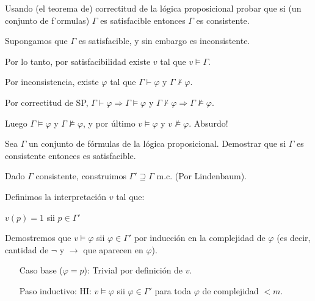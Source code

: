 \begin{questions}
\begin{solution}
\begin{itemize}[\quad]
 \end{itemize}

\end{solution}

\question Usando (el teorema de) correctitud de la lógica proposicional probar que si (un conjunto de f'ormulas) $\Gamma$ es satisfacible entonces $\Gamma$ es consistente. 


\begin{solution}

Supongamos que $\Gamma$ es satisfacible, y sin embargo es inconsistente. 

Por lo tanto, por satisfacibilidad existe $v$ tal que $v\vDash\Gamma$.

Por inconsistencia, existe $\varphi$ tal que $\Gamma \vdash \varphi$ y $\Gamma \nvdash \varphi$.

Por correctitud de SP, $\Gamma\vdash\varphi \Rightarrow \Gamma\vDash\varphi$ y $\Gamma\nvdash\varphi\Rightarrow \Gamma\nvDash\varphi$. 

Luego $\Gamma\vDash\varphi$ y $\Gamma\nvDash\varphi$, y por \'ultimo $v \vDash \varphi$ y $v \nvDash \varphi$. Absurdo!

\end{solution}

\question Sea $\Gamma$ un conjunto de f\'ormulas de la l\'ogica proposicional. Demostrar que si $\Gamma$ es consistente entonces es satisfacible. 


\begin{solution}
 
 Dado $\Gamma$ consistente, construimos $\Gamma'\supseteq\Gamma$ m.c. (Por Lindenbaum).
 
 Definimos la interpretaci\'on $v$ tal que: 
 
 \begin{center}
  $v(p) = 1$ sii $p\in\Gamma'$
 \end{center}
 
 Demostremos que $v\vDash\varphi$ sii $\varphi\in\Gamma'$ por inducci\'on en la complejidad de $\varphi$ (es decir, cantidad de $\neg$ y $\rightarrow$ que aparecen en $\varphi$).

 \begin{enumerate}[\quad]
  \item[Caso base ($\varphi=p$):] Trivial por definici\'on de $v$. 

  \item[Paso inductivo:] HI: $v\vDash\varphi$ sii $\varphi\in\Gamma'$ para toda $\varphi$ de complejidad $<m$.
  

\end{enumerate}
\end{solution}
\end{questions}
